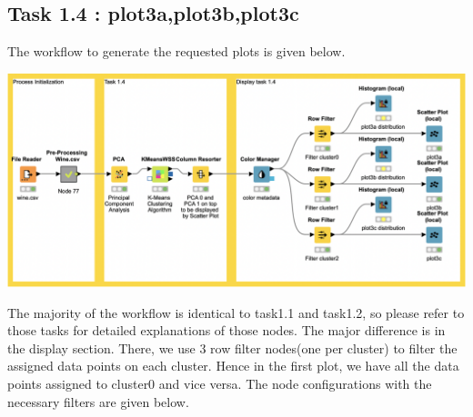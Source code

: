 \documentclass[11pt]{article}
\begin{document}
		 \subsection*{Task 1.4 : plot3a,plot3b,plot3c}
			The workflow to generate the requested plots is given below.
			\iftrue
			\begin{center}
				\includegraphics[scale=0.25]{res/t1/t14/t14-workflow}
			\end{center}
			\fi
			The majority of the workflow is identical to task1.1 and task1.2, so please refer to those tasks for detailed explanations of those nodes. The major difference is in the display section. There, we use 3 row filter nodes(one per cluster) to filter the assigned data points on each cluster. Hence in the first plot, we have all the data points assigned to cluster0 and vice versa. The node configurations with the necessary filters are given below.
			\iftrue
\end{document}
